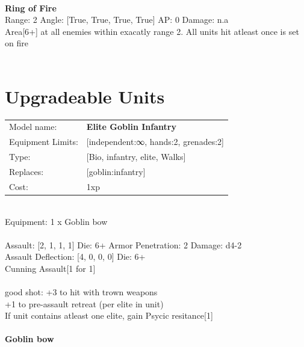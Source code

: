 \ \\
{\bf Ring of Fire } \\



Range: 2  Angle: [True, True, True, True] AP: 0 Damage: n.a \\
Area[6+] at all enemies within exacatly range 2. All units hit atleast once is set on fire\\ 




 
\ \\













\section{Upgradeable Units}\noindent
\begin{tabular}{ll}
Model name: &{\bf Elite Goblin Infantry } \\
Equipment Limits: &[independent:∞, hands:2, grenades:2] \\
Type: &[Bio, infantry, elite, Walks] \\
Replaces: &[goblin:infantry] \\
Cost: & 1xp\\
\end{tabular}
\ \\
Equipment: 1 x Goblin bow \\
\ \\
Assault: [2, 1, 1, 1] Die: 6+ Armor Penetration: 2 Damage: d4-2 \\
Assault Deflection: [4, 0, 0, 0] Die: 6+\\
\indent Cunning Assault[1 for 1]\\ 
 
\ \\
good shot: +3 to hit with trown weapons\\ 
+1 to pre-assault retreat (per elite in unit)\\ 
If unit contains atleast one elite, gain Psycic resitance[1]\\ 

\ \\
{\bf Goblin bow } \\



